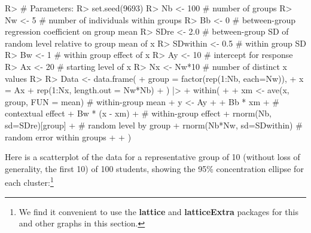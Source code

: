 \documentclass[
]{jss}
\begin{document}
\begin{CodeChunk}
\begin{CodeInput}
R> # Parameters:
R> set.seed(9693) 
R> Nb <- 100     # number of groups
R> Nw <- 5       # number of individuals within groups
R> Bb <- 0       # between-group regression coefficient on group mean
R> SDre <- 2.0   # between-group SD of random level relative to group mean of x
R> SDwithin <- 0.5  # within group SD
R> Bw <- 1          # within group effect of x
R> Ay <- 10         # intercept for response
R> Ax <- 20         # starting level of x
R> Nx <- Nw*10      # number of distinct x values
R> 
R> Data <- data.frame(
+   group = factor(rep(1:Nb, each=Nw)),
+   x = Ax + rep(1:Nx, length.out = Nw*Nb)
+ ) |>
+   within(
+     {
+       xm  <- ave(x, group, FUN = mean) # within-group mean
+       y <- Ay +
+         Bb * xm +                    # contextual effect
+         Bw * (x - xm) +              # within-group effect
+         rnorm(Nb, sd=SDre)[group] +  # random level by group
+         rnorm(Nb*Nw, sd=SDwithin)    # random error within groups
+     }
+   )
\end{CodeInput}
\end{CodeChunk}

Here is a scatterplot of the data for a representative group of 10
(without loss of generality, the first 10) of 100 students, showing the
95\% concentration ellipse for each cluster:\footnote{We find it
  convenient to use the \textbf{lattice} \citep{Sarkar:2008} and
  \textbf{latticeExtra} \citep{SarkarAndrews:2022} packages for this and
  other graphs in this section.}
\end{document}
